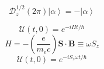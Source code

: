 \documentclass{article}
\newcommand{\ket}[1]{\ensuremath{\left|#1\right\rangle}}
\begin{document}
\begin{equation}
  \mathcal{D}_z^{1/2}(2\pi)\ket{\alpha} = -\ket{\alpha}
\end{equation}


\begin{equation}
  \mathcal{U}(t, 0) = e^{-iHt/\hbar}
\end{equation}
\begin{equation}
  H = -\left( \frac{e}{m_ec} \right)\mathbf{S}\cdot\mathbf{B} \equiv \omega S_z
\end{equation}
\begin{equation}
  \mathcal{U}(t,0) = e^{-iS_z\omega t/\hbar}
\end{equation}
\end{document}
